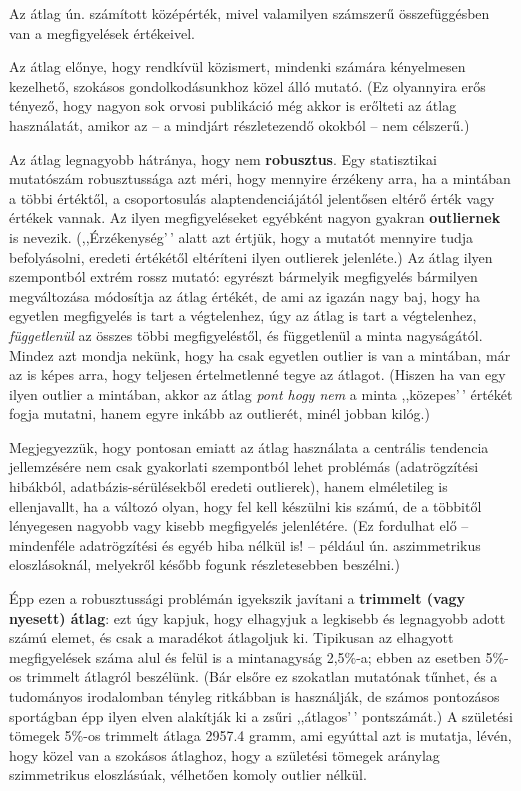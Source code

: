 \documentclass[
]{book}
\begin{document}
Az átlag ún. számított középérték, mivel valamilyen számszerű összefüggésben van a megfigyelések értékeivel.

Az átlag előnye, hogy rendkívül közismert, mindenki számára kényelmesen kezelhető, szokásos gondolkodásunkhoz közel álló mutató. (Ez olyannyira erős tényező, hogy nagyon sok orvosi publikáció még akkor is erőlteti az átlag használatát, amikor az -- a mindjárt részletezendő okokból -- nem célszerű.)

Az átlag legnagyobb hátránya, hogy nem \textbf{robusztus}. Egy statisztikai mutatószám robusztussága azt méri, hogy mennyire érzékeny arra, ha a mintában a többi értéktől, a csoportosulás alaptendenciájától jelentősen eltérő érték vagy értékek vannak. Az ilyen megfigyeléseket egyébként nagyon gyakran \textbf{outliernek} is nevezik. (,,Érzékenység'\,' alatt azt értjük, hogy a mutatót mennyire tudja befolyásolni, eredeti értékétől eltéríteni ilyen outlierek jelenléte.) Az átlag ilyen szempontból extrém rossz mutató: egyrészt bármelyik megfigyelés bármilyen megváltozása módosítja az átlag értékét, de ami az igazán nagy baj, hogy ha egyetlen megfigyelés is tart a végtelenhez, úgy az átlag is tart a végtelenhez, \emph{függetlenül} az összes többi megfigyeléstől, és függetlenül a minta nagyságától. Mindez azt mondja nekünk, hogy ha csak egyetlen outlier is van a mintában, már az is képes arra, hogy teljesen értelmetlenné tegye az átlagot. (Hiszen ha van egy ilyen outlier a mintában, akkor az átlag \emph{pont hogy nem} a minta ,,közepes'\,' értékét fogja mutatni, hanem egyre inkább az outlierét, minél jobban kilóg.)

Megjegyezzük, hogy pontosan emiatt az átlag használata a centrális tendencia jellemzésére nem csak gyakorlati szempontból lehet problémás (adatrögzítési hibákból, adatbázis-sérülésekből eredeti outlierek), hanem elméletileg is ellenjavallt, ha a változó olyan, hogy fel kell készülni kis számú, de a többitől lényegesen nagyobb vagy kisebb megfigyelés jelenlétére. (Ez fordulhat elő -- mindenféle adatrögzítési és egyéb hiba nélkül is! -- például ún. aszimmetrikus eloszlásoknál, melyekről később fogunk részletesebben beszélni.)

Épp ezen a robusztussági problémán igyekszik javítani a \textbf{trimmelt (vagy nyesett) átlag}: ezt úgy kapjuk, hogy elhagyjuk a legkisebb és legnagyobb adott számú elemet, és csak a maradékot átlagoljuk ki. Tipikusan az elhagyott megfigyelések száma alul és felül is a mintanagyság 2,5\%-a; ebben az esetben 5\%-os trimmelt átlagról beszélünk. (Bár elsőre ez szokatlan mutatónak tűnhet, és a tudományos irodalomban tényleg ritkábban is használják, de számos pontozásos sportágban épp ilyen elven alakítják ki a zsűri ,,átlagos'\,' pontszámát.) A születési tömegek 5\%-os trimmelt átlaga 2957.4 gramm, ami egyúttal azt is mutatja, lévén, hogy közel van a szokásos átlaghoz, hogy a születési tömegek aránylag szimmetrikus eloszlásúak, vélhetően komoly outlier nélkül.
\end{document}
